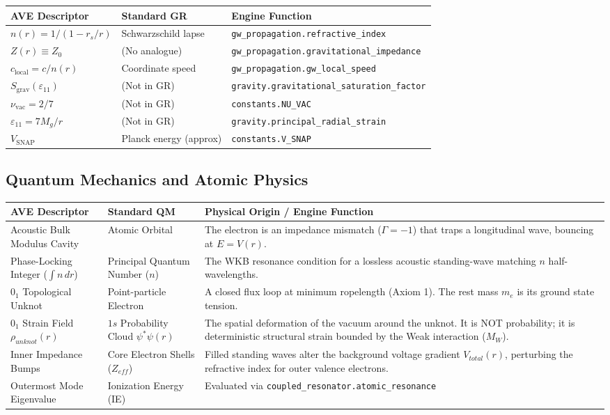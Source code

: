 \begin{center}
\renewcommand{\arraystretch}{1.3}
\begin{tabular}{l l l}
\toprule
\textbf{AVE Descriptor} & \textbf{Standard GR} & \textbf{Engine Function} \\
\midrule
$n(r) = 1/(1 - r_s/r)$ & Schwarzschild lapse & \texttt{gw\_propagation.refractive\_index} \\
$Z(r) \equiv Z_0$ & (No analogue) & \texttt{gw\_propagation.gravitational\_impedance} \\
$c_\mathrm{local} = c/n(r)$ & Coordinate speed & \texttt{gw\_propagation.gw\_local\_speed} \\
$S_\mathrm{grav}(\varepsilon_{11})$ & (Not in GR) & \texttt{gravity.gravitational\_saturation\_factor} \\
$\nu_\mathrm{vac} = 2/7$ & (Not in GR) & \texttt{constants.NU\_VAC} \\
$\varepsilon_{11} = 7M_g/r$ & (Not in GR) & \texttt{gravity.principal\_radial\_strain} \\
$V_\mathrm{SNAP}$ & Planck energy (approx) & \texttt{constants.V\_SNAP} \\
\bottomrule
\end{tabular}
\end{center}

\subsection{Quantum Mechanics and Atomic Physics}

\begin{center}
\renewcommand{\arraystretch}{1.5}
\begin{tabular}{p{5cm} p{5cm} p{5cm}}
\toprule
\textbf{AVE Descriptor} & \textbf{Standard QM} & \textbf{Physical Origin / Engine Function} \\
\midrule
Acoustic Bulk Modulus Cavity & Atomic Orbital & The electron is an impedance mismatch ($\Gamma=-1$) that traps a longitudinal wave, bouncing at $E=V(r)$. \\
Phase-Locking Integer ($\int n\, dr$) & Principal Quantum Number ($n$) & The WKB resonance condition for a lossless acoustic standing-wave matching $n$ half-wavelengths. \\
$0_1$ Topological Unknot & Point-particle Electron & A closed flux loop at minimum ropelength (Axiom 1). The rest mass $m_e$ is its ground state tension. \\
$0_1$ Strain Field $\rho_{unknot}(r)$ & $1s$ Probability Cloud $\psi^*\psi(r)$ & The spatial deformation of the vacuum around the unknot. It is NOT probability; it is deterministic structural strain bounded by the Weak interaction ($M_W$). \\
Inner Impedance Bumps & Core Electron Shells ($Z_{eff}$) & Filled standing waves alter the background voltage gradient $V_{total}(r)$, perturbing the refractive index for outer valence electrons. \\
Outermost Mode Eigenvalue & Ionization Energy (IE) & Evaluated via \texttt{coupled\_resonator.atomic\_resonance} \\
\bottomrule
\end{tabular}
\end{center}


